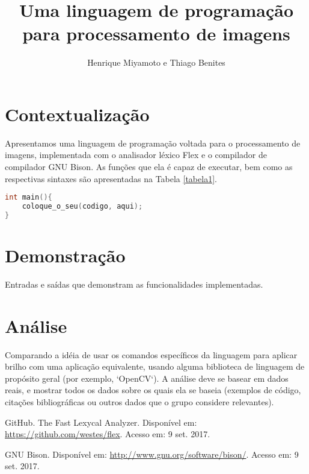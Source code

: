 \documentclass[a4paper, 10pt, conference]{ieeeconf}
\title{\LARGE \bf Uma linguagem de programação para processamento de imagens}
\author{Henrique Miyamoto e Thiago Benites}
\begin{document}
\maketitle
\thispagestyle{empty}
\pagestyle{empty}




\section{Contextualização}


Apresentamos uma linguagem de programação voltada para o processamento de imagens, implementada com o analisador léxico Flex \cite{flex} e o compilador de compilador GNU Bison\cite{bison}. As funções que ela é capaz de executar, bem como as respectivas sintaxes são apresentadas na Tabela \ref{tabela1}.

\begin{lstlisting}[language=C, basicstyle=\footnotesize, frame=single]
int main(){
	coloque_o_seu(codigo, aqui);
}
\end{lstlisting}

\section{Demonstração}

Entradas e saídas que demonstram as funcionalidades implementadas.

\section{Análise}

Comparando a idéia de usar os comandos específicos da linguagem para aplicar brilho com uma aplicação equivalente, usando alguma biblioteca de linguagem de propósito geral (por exemplo, `OpenCV`). A análise deve se basear em dados reais, e mostrar todos os dados sobre os quais ela se baseia (exemplos de código, citações bibliográficas ou outros dados que o grupo considere relevantes).

\begin{thebibliography}{99}

 GitHub. The Fast Lexycal Analyzer. Disponível em: \url{https://github.com/westes/flex}. Acesso em: 9 set. 2017. 

 GNU Bison. Disponível em: \url{http://www.gnu.org/software/bison/}. Acesso em: 9 set. 2017.

\end{thebibliography}
\end{document}
